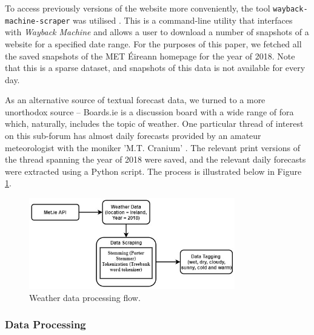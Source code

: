 \documentclass[a4paper,10pt]{article}
\begin{document}
    To access previously versions of the website more conveniently, the tool \texttt{wayback-machine-scraper} was utilised . This is a command-line utility that interfaces with \textit{Wayback Machine} and allows a user to download a number of snapshots of a website for a specified date range. For the purposes of this paper, we fetched all the saved snapshots of the MET \'{E}ireann homepage for the year of 2018. Note that this is a sparse dataset, and snapshots of this data is not available for every day.

    As an alternative source of textual forecast data, we turned to a more unorthodox source -- Boards.ie is a discussion board with a wide range of fora which, naturally, includes the topic of weather. One particular thread of interest on this sub-forum has almost daily forecasts provided by an amateur meteorologist with the moniker 'M.T. Cranium' . The relevant print versions of the thread spanning the year of 2018 were saved, and the relevant daily forecasts were extracted using a Python script. The process is illustrated below in Figure \ref{fig:weather_process_flow}.

    \begin{figure}
        \includegraphics[width=0.8\textwidth]{weather_process_flow.jpeg}
        \caption{Weather data processing flow.}
        \label{fig:weather_process_flow}
    \end{figure}


    \subsubsection{Data Processing}
\end{document}
